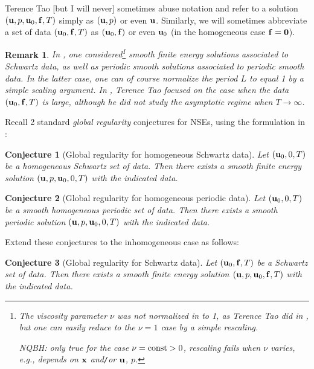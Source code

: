 \documentclass{article}
\numberwithin{equation}{section}
\newtheorem{remark}{Remark}[section]
\newtheorem{conjecture}{Conjecture}[section]
\begin{document}
Terence Tao [but I will never] sometimes abuse notation and refer to a solution $({\bf u},p,{\bf u}_0,{\bf f},T)$ simply as $({\bf u},p)$ or even ${\bf u}$. Similarly, we will sometimes abbreviate a set of data $({\bf u}_0,{\bf f},T)$ as $({\bf u}_0,{\bf f})$ or even ${\bf u}_0$ (in the homogeneous case ${\bf f} = {\bf 0}$).

\begin{remark}
	In \cite{Fefferman2006}, one considered\footnote{The viscosity parameter $\nu$ was not normalized in \cite{Fefferman2006} to 1, as Terence Tao did in \cite{Tao2013}, but one can easily reduce to the $\nu = 1$ case by a simple rescaling.
	
	NQBH: only true for the case $\nu = {\rm const} > 0$, rescaling fails when $\nu$ varies, e.g., depends on ${\bf x}$ and\texttt{/}or ${\bf u}$, $p$.} smooth finite energy solutions associated to Schwartz data, as well as periodic smooth solutions associated to periodic smooth data. In the latter case, one can of course normalize the period $L$ to equal 1 by a simple scaling argument. In \cite{Tao2013}, Terence Tao focused on the case when the data $({\bf u}_0,{\bf f},T)$ is large, although he did not study the asymptotic regime when $T\to\infty$.
\end{remark}
Recall 2 standard \textit{global regularity} conjectures for NSEs, using the formulation in \cite{Fefferman2006}:

\begin{conjecture}[Global regularity for homogeneous Schwartz data]
	Let $({\bf u}_0,0,T)$ be a homogeneous Schwartz set of data. Then there exists a smooth finite energy solution $({\bf u},p,{\bf u}_0,0,T)$ with the indicated data.
\end{conjecture}

\begin{conjecture}[Global regularity for homogeneous periodic data]
	Let $({\bf u}_0,0,T)$ be a smooth homogeneous periodic set of data. Then there exists a smooth periodic solution $({\bf u},p,{\bf u}_0,0,T)$ with the indicated data.
\end{conjecture}
Extend these conjectures to the inhomogeneous case as follows:

\begin{conjecture}[Global regularity for Schwartz data]
	Let $({\bf u}_0,{\bf f},T)$ be a Schwartz set of data. Then there exists a smooth finite energy solution $({\bf u},p,{\bf u}_0,{\bf f},T)$ with the indicated data.
\end{conjecture}
\end{document}
